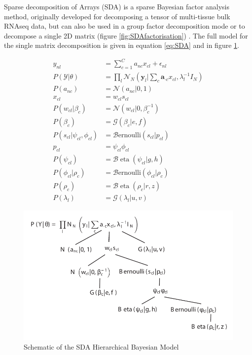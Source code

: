 Sparse decomposition of Arrays (SDA) is a sparse Bayesian factor analysis method, originally developed for decomposing a tensor of multi-tissue bulk RNAseq data, but can also be used in a group factor decomposition mode or to decompose a single 2D matrix (figure \ref{fig:SDAfactorisation}) \parencite{Hore2015Latent, Hore2016Tensor}. The full model for the single matrix decomposition is given in equation \ref{eq:SDA} and in figure \ref{fig:SDAmodel}.

\begin{equation}
\begin{aligned}
y_{n l} &= \sum_{c=1}^{C} a_{n c} x_{c l}+\epsilon_{n l} \\
P(\mathcal{Y} | \theta) &=\prod_{l} \mathcal{N}_{N}\left(\mathbf{y}_{l} | \sum_{c} \mathbf{a}_{\cdot c} x_{c l}, \lambda_{l}^{-1} I_{N}\right) \\ 
P\left(a_{n c}\right) &=\mathcal{N}\left(a_{n c} | 0,1\right) \\
x_{c l} &= w_{c l} s_{c l} \\
P\left(w_{c l} | \beta_{c}\right) &=\mathcal{N}\left(w_{c l} | 0, \beta_{c}^{-1}\right) \\
P\left(\beta_{c}\right) &=\mathcal{G}\left(\beta_{c} | e, f\right) \\ 
P\left(s_{c l} | \psi_{c l}, \phi_{c l}\right) &=\mathcal{B} \text{ernoulli}\left(s_{c l} | p_{c l}\right) \\ 
p_{c l} &= \psi_{c l} \phi_{c l} \\
P\left(\psi_{c l}\right) &=\mathcal{B} \operatorname{eta}\left(\psi_{c l} | g, h\right) \\
P\left(\phi_{c l} | \rho_{c}\right) &=\mathcal{B} \text{ernoulli}\left(\phi_{c l} | \rho_{c}\right) \\
P\left(\rho_{c}\right) &=\mathcal{B} \operatorname{eta}\left(\rho_{c} | r, z\right) \\
P\left(\lambda_{l}\right) &=\mathcal{G}\left(\lambda_{l} | u, v\right) 
\label{eq:SDA}
\end{aligned}
\end{equation}

\begin{figure}[H]
	\centering
	\includegraphics[width=\textwidth]{figures/intro/SDA.pdf}
	\caption[SDA Model]{Schematic of the SDA Hierarchical Bayesian Model}
	\label{fig:SDAmodel}
\end{figure}

